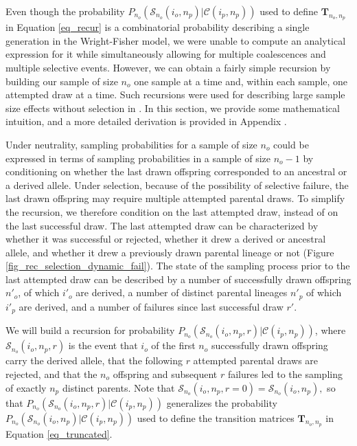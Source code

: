 \documentclass[9pt,twocolumn,twoside,lineno]{gsajnl}
\newcommand{\ms}{\mathcal{S}}
\begin{document}
Even though the probability $P_{n_o}(\mathcal{S}_{n_o}(i_o, n_p)| \mathcal{C}(i_p,n_p))$ used to define $\mathbf{T}_{n_o,n_p}$ in Equation \ref{eq_recur} is a combinatorial probability
describing a single generation in the Wright-Fisher model, we were unable to compute an analytical
expression for it while simultaneously allowing for multiple coalescences and multiple selective events.
However, we can obtain a fairly simple recursion by building our sample of size $n_o$ one sample at a time and, within each sample, one attempted draw at a time. 
Such recursions were used for
describing large sample size effects without selection in \citep{BhaskarEtAl2014}. In this section,
we provide some mathematical intuition, and a more detailed derivation is provided in
Appendix .

Under neutrality, sampling probabilities for a sample of size $n_o$ could be expressed in terms of sampling probabilities in a sample of size $n_o-1$ by conditioning on whether the last drawn offspring corresponded to an ancestral or a derived allele. 
Under selection, because of the possibility of selective failure, the last drawn offspring
may require multiple attempted parental draws. To simplify the recursion, we therefore condition on the last attempted draw, instead of on the last successful draw.    
The last attempted draw can be characterized by whether it was successful or rejected,
whether it drew a derived or ancestral allele, and whether it drew a previously drawn parental
lineage or not (Figure \ref{fig_rec_selection_dynamic_fail}).  The state of the sampling process
prior to the last attempted draw can be described by a number of successfully drawn offspring $n'_o$, of which
$i'_o$ are derived, a number of distinct parental lineages $n'_p$ of which $i'_p$ are derived, and a
number of failures since last successful draw $r'$.  

We will build a recursion for probability $P_{n_o}(\mathcal{S}_{n_o}(i_o, n_p, r)| \mathcal{C}(i_p,n_p) )$, where $\ms_{n_o}(i_o,n_p, r)$ is the
event that $i_o$ of the first $n_o$ successfully drawn offspring carry the derived allele, that the following $r$
attempted parental draws are rejected, and that the $n_o$ offspring and subsequent $r$ failures led to the sampling of exactly $n_p$ distinct parents. Note that $\ms_{n_o}(i_o,n_p, r=0) =  \ms_{n_o}(i_o,n_p),$ so that $P_{n_o}(\mathcal{S}_{n_o}(i_o, n_p, r)| \mathcal{C}(i_p,n_p) )$ generalizes the probability $P_{n_o}(\mathcal{S}_{n_o}(i_o, n_p)| \mathcal{C}(i_p,n_p))$ used to define the transition matrices $\mathbf{T}_{n_o,n_p}$ in Equation \eqref{eq_truncated}. 
\end{document}
